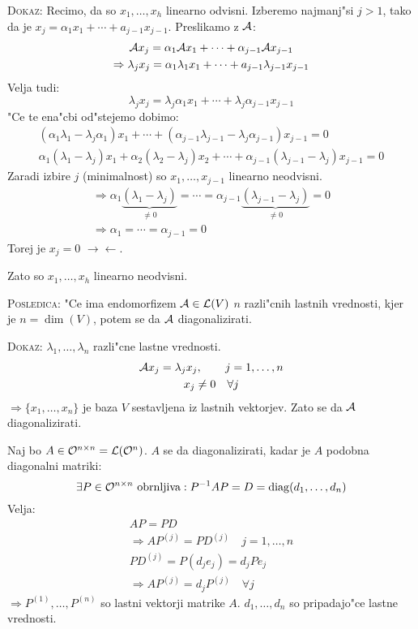 \textsc{Dokaz:} Recimo, da so $x_1, \ldots, x_h$ linearno odvisni. Izberemo najmanj"si $j > 1$, tako da je $x_j = \alpha_1 x_1 + \cdots + a_{j-1} x_{j-1}$. Preslikamo z $\mathcal{A}$:
\begin{gather*}
\mathcal{A} x_j = \alpha_1 \mathcal{A} x_1 + \cdots + \alpha_{j-1} \mathcal{A} x_{j-1} \\
\Rightarrow \lambda_j x_j = \alpha_1 \lambda_1 x_1 + \cdots + a_{j-1} \lambda_{j-1} x_{j-1} \\
\end{gather*}
Velja tudi:
\begin{equation*}
\lambda_j x_j = \lambda_j \alpha_1 x_1 + \cdots + \lambda_j \alpha_{j-1}x_{j-1}
\end{equation*}
"Ce te ena"cbi od"stejemo dobimo:
\begin{gather*}
(\alpha_1 \lambda_1 - \lambda_j \alpha_1) x_1 + \cdots + (\alpha_{j-1} \lambda_{j-1} - \lambda_j \alpha_{j-1})x_{j-1} = 0 \\
\alpha_1 (\lambda_1 - \lambda_j) x_1 + \alpha_2 (\lambda_2 - \lambda_j) x_2 + \cdots + \alpha_{j-1} (\lambda_{j-1} - \lambda_j) x_{j-1} = 0
\end{gather*}
Zaradi izbire $j$ (minimalnost) so $x_1, \ldots, x_{j-1}$ linearno neodvisni.
\begin{gather*}
\Rightarrow \alpha_1 \underbrace{(\lambda_1 - \lambda_j)}_{\neq 0} = \cdots = \alpha_{j-1} \underbrace{(\lambda_{j-1} - \lambda_j)}_{\neq 0} = 0 \\
\Rightarrow \alpha_1 = \cdots = \alpha_{j-1} = 0
\end{gather*}
Torej je $x_j = 0$ $\rightarrow \leftarrow$.

Zato so $x_1, \ldots, x_h$ linearno neodvisni.

\textsc{Posledica:} "Ce ima endomorfizem $\mathcal{A} \in \mathcal{L}(V)$ $n$ razli"cnih lastnih vrednosti, kjer je $n = \dim (V)$, potem se da $\mathcal{A}$ diagonalizirati.

\textsc{Dokaz:} $\lambda_1, \ldots, \lambda_n$ razli"cne lastne vrednosti.
\begin{gather*}
\mathcal{A} x_j = \lambda_j x_j, \qquad j = 1, \ldots, n \\
x_j \neq 0 \quad \forall j
\end{gather*}
$\Rightarrow \{x_1, \ldots, x_n\}$ je baza $V$ sestavljena iz lastnih vektorjev. Zato se da $\mathcal{A}$ diagonalizirati.

Naj bo $A \in \mathcal{O}^{n \times n} = \mathcal{L}(\mathcal{O}^{n})$. $A$ se da diagonalizirati, kadar je $A$ podobna diagonalni matriki:
\begin{equation*}
\exists P \in \mathcal{O}^{n \times n} \text{ obrnljiva}: P^{-1}AP = D = \operatorname{diag}(d_1, \ldots, d_n)
\end{equation*}
Velja:
\begin{gather*}
AP = PD \\
\Rightarrow AP^{(j)} = PD^{(j)} \quad j = 1, \ldots, n \\
PD^{(j)} = P(d_j e_j) = d_j Pe_j \\
\Rightarrow AP^{(j)} = d_jP^{(j)} \quad \forall j
\end{gather*}
$\Rightarrow P^{(1)}, \ldots, P^{(n)}$ so lastni vektorji matrike $A$. $d_1, \ldots, d_n$ so pripadajo"ce lastne vrednosti.
%
